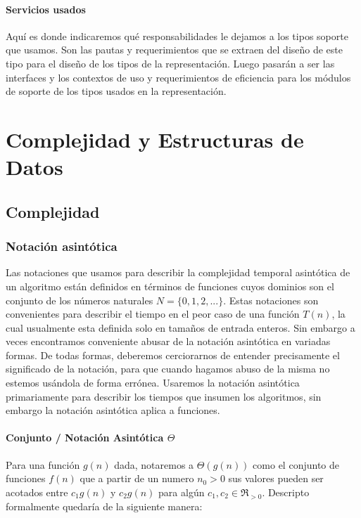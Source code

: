 \documentclass[10pt, a4paper]{report}
\begin{document}
\subsubsection{Servicios usados}

Aqu\'i es donde indicaremos qu\'e responsabilidades le dejamos a los tipos soporte que usamos. Son las pautas y requerimientos que se extraen del dise\~no de este tipo para el dise\~no de los tipos de la representaci\'on. Luego pasar\'an a ser las interfaces y los contextos de uso y requerimientos de eficiencia para los m\'odulos de soporte de los tipos usados en la representaci\'on.

\newpage

\chapter{Complejidad y Estructuras de Datos}

\section{Complejidad}
\subsection{Notaci\'on asint\'otica}

Las notaciones que usamos para describir la complejidad temporal asint\'otica de un algoritmo est\'an definidos en t\'erminos de funciones cuyos dominios son el conjunto de los n\'umeros naturales $N = \{0,1,2,...\}$. Estas notaciones son convenientes para describir el tiempo en el peor caso de una funci\'on $T(n)$, la cual usualmente esta definida solo en tama\~nos de entrada enteros. Sin embargo a veces encontramos conveniente abusar de la notaci\'on asint\'otica en variadas formas. De todas formas, deberemos cerciorarnos de entender precisamente el significado de la notaci\'on, para que cuando hagamos abuso de la misma no estemos us\'andola de forma err\'onea. Usaremos la notaci\'on asint\'otica primariamente para describir los tiempos que insumen los algoritmos, sin embargo la notaci\'on asint\'otica aplica a funciones.

\subsubsection{Conjunto / Notaci\'on Asint\'otica $\Theta$}

Para una funci\'on $g(n)$ dada, notaremos a $\Theta(g(n))$ como el conjunto de funciones $f(n)$ que a partir de un numero $n_0 > 0$ sus valores pueden ser acotados entre $c_1g(n)$ y $c_2g(n)$ para alg\'un $c_1, c_2 \in \Re_{>0}$. Descripto formalmente quedar\'ia de la siguiente manera:
\end{document}
